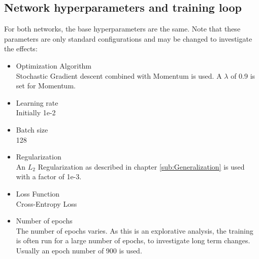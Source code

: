 \subsection{Network hyperparameters and training loop}\label{sub:Hyperparameters}
For both networks, the base hyperparameters are the same. Note that these
parameters are only standard configurations and may be changed to investigate
the effects:
\begin{itemize}
    \item Optimization Algorithm \\Stochastic Gradient descent combined with
    Momentum is used. A $\lambda$ of 0.9 is set for Momentum.
    \item Learning rate \\Initially 1e-2
    \item Batch size \\128
    \item Regularization \\An $L_2$ Regularization as described in chapter
    \ref{sub:Generalization} is used with a factor of 1e-3.
    \item Loss Function \\Cross-Entropy Loss
    \item Number of epochs \\The number of epochs varies. As this is an
    explorative analysis, the training is often run for a large number of
    epochs, to investigate long term changes. Usually an epoch number of 900 is
    used.
\end{itemize}

